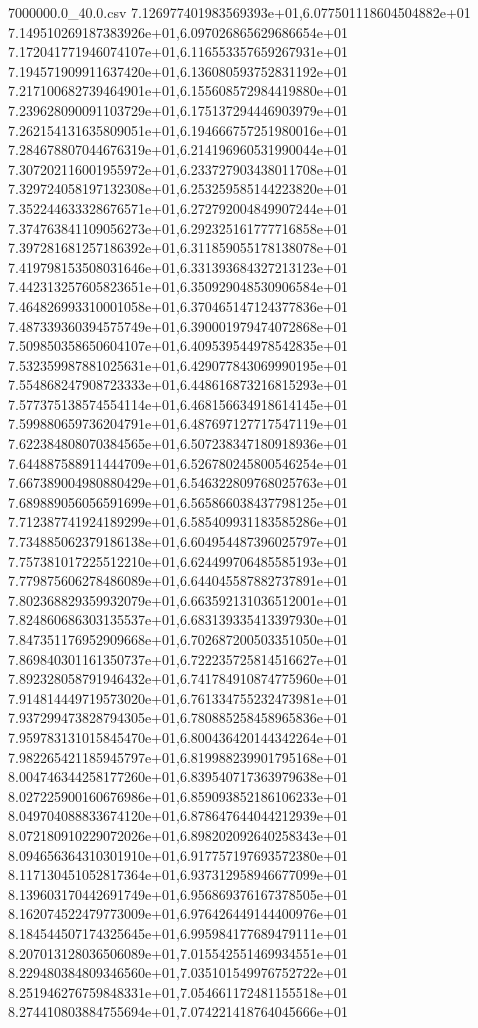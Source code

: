 \begin{filecontents*}{7000000.0_40.0.csv}
7.126977401983569393e+01,6.077501118604504882e+01
7.149510269187383926e+01,6.097026865629686654e+01
7.172041771946074107e+01,6.116553357659267931e+01
7.194571909911637420e+01,6.136080593752831192e+01
7.217100682739464901e+01,6.155608572984419880e+01
7.239628090091103729e+01,6.175137294446903979e+01
7.262154131635809051e+01,6.194666757251980016e+01
7.284678807044676319e+01,6.214196960531990044e+01
7.307202116001955972e+01,6.233727903438011708e+01
7.329724058197132308e+01,6.253259585144223820e+01
7.352244633328676571e+01,6.272792004849907244e+01
7.374763841109056273e+01,6.292325161777716858e+01
7.397281681257186392e+01,6.311859055178138078e+01
7.419798153508031646e+01,6.331393684327213123e+01
7.442313257605823651e+01,6.350929048530906584e+01
7.464826993310001058e+01,6.370465147124377836e+01
7.487339360394575749e+01,6.390001979474072868e+01
7.509850358650604107e+01,6.409539544978542835e+01
7.532359987881025631e+01,6.429077843069990195e+01
7.554868247908723333e+01,6.448616873216815293e+01
7.577375138574554114e+01,6.468156634918614145e+01
7.599880659736204791e+01,6.487697127717547119e+01
7.622384808070384565e+01,6.507238347180918936e+01
7.644887588911444709e+01,6.526780245800546254e+01
7.667389004980880429e+01,6.546322809768025763e+01
7.689889056056591699e+01,6.565866038437798125e+01
7.712387741924189299e+01,6.585409931183585286e+01
7.734885062379186138e+01,6.604954487396025797e+01
7.757381017225512210e+01,6.624499706485585193e+01
7.779875606278486089e+01,6.644045587882737891e+01
7.802368829359932079e+01,6.663592131036512001e+01
7.824860686303135537e+01,6.683139335413397930e+01
7.847351176952909668e+01,6.702687200503351050e+01
7.869840301161350737e+01,6.722235725814516627e+01
7.892328058791946432e+01,6.741784910874775960e+01
7.914814449719573020e+01,6.761334755232473981e+01
7.937299473828794305e+01,6.780885258458965836e+01
7.959783131015845470e+01,6.800436420144342264e+01
7.982265421185945797e+01,6.819988239901795168e+01
8.004746344258177260e+01,6.839540717363979638e+01
8.027225900160676986e+01,6.859093852186106233e+01
8.049704088833674120e+01,6.878647644044212939e+01
8.072180910229072026e+01,6.898202092640258343e+01
8.094656364310301910e+01,6.917757197693572380e+01
8.117130451052817364e+01,6.937312958946677099e+01
8.139603170442691749e+01,6.956869376167378505e+01
8.162074522479773009e+01,6.976426449144400976e+01
8.184544507174325645e+01,6.995984177689479111e+01
8.207013128036506089e+01,7.015542551469934551e+01
8.229480384809346560e+01,7.035101549976752722e+01
8.251946276759848331e+01,7.054661172481155518e+01
8.274410803884755694e+01,7.074221418764045666e+01

\end{filecontents*}
